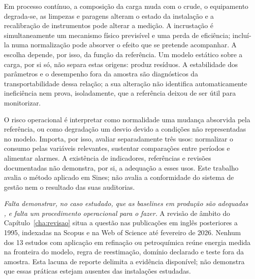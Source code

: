 Em processo contínuo, a composição da carga muda com o crude, o
equipamento degrada-se, as limpezas e paragens alteram o estado da
instalação e a recalibração de instrumentos pode alterar a medição.
A incrustação é simultaneamente um mecanismo físico previsível e uma
perda de eficiência; incluí-la numa normalização pode absorver o efeito
que se pretende acompanhar. A escolha depende, por isso, da função da
referência. Um modelo estático sobre a carga, por si só, não separa estas
origens: produz resíduos. A estabilidade dos parâmetros e o desempenho
fora da amostra são diagnósticos da transportabilidade dessa relação;
a sua alteração não identifica automaticamente ineficiência nem prova,
isoladamente, que a referência deixou de ser útil para monitorizar.


O risco operacional é interpretar como normalidade uma mudança absorvida
pela referência, ou como degradação um desvio devido a condições não
representadas no modelo. Importa, por isso, avaliar separadamente três
usos: normalizar o consumo pelas variáveis relevantes, sustentar
comparações entre períodos e alimentar alarmes. A existência de
indicadores, referências e revisões documentadas não demonstra, por si,
a adequação a esses usos. Este trabalho avalia o método aplicado em
Sines; não avalia a conformidade do sistema de gestão nem o resultado
das suas auditorias.

\emph{Falta demonstrar, no caso estudado, que as \emph{baselines} em
produção são adequadas , e falta
um procedimento operacional para o fazer.} A revisão de âmbito do
Capítulo~\ref{cha:revisao} situa a questão nas publicações em inglês
posteriores a 1995, indexadas na Scopus e na Web of Science até fevereiro
de 2026.  Nenhum dos 13 estudos com aplicação em refinação ou
petroquímica reúne energia medida na fronteira do modelo, regra de
reestimação, domínio declarado e teste fora da amostra.  Esta lacuna
de reporte delimita a evidência disponível; não demonstra que essas práticas
estejam ausentes das instalações estudadas.


